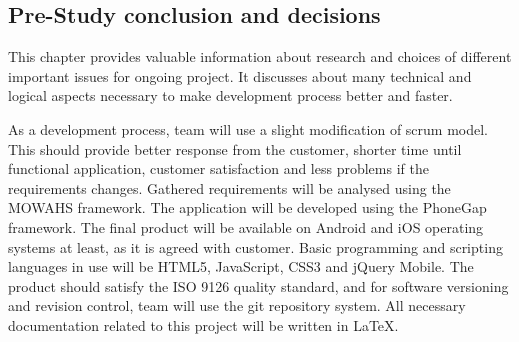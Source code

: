 \subsection{Pre-Study conclusion and decisions}

This chapter provides valuable information about research and choices of different important issues for ongoing project. It discusses about many technical and logical aspects necessary to make development process better and faster.\newline

As a development process, team will use a slight modification of scrum model. This should provide better response from the customer, shorter time until functional application, customer satisfaction and less problems if the requirements changes. Gathered requirements will be analysed using the MOWAHS framework. The application will be developed using the PhoneGap framework. The final product will be available on Android and iOS operating systems at least, as it is agreed with customer. Basic programming and scripting languages in use will be HTML5, JavaScript, CSS3 and jQuery Mobile. The product should satisfy the ISO 9126 quality standard, and for software versioning and revision control, team will use the git repository system. All necessary documentation related to this project will be written in LaTeX.
